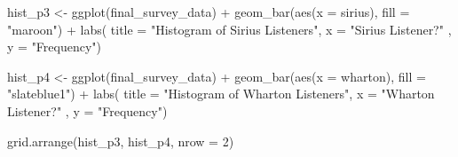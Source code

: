 \documentclass[
]{article}
\newenvironment{Shaded}{\begin{snugshade}}{\end{snugshade}}
\newcommand{\AttributeTok}[1]{\textcolor[rgb]{0.77,0.63,0.00}{#1}}
\newcommand{\DecValTok}[1]{\textcolor[rgb]{0.00,0.00,0.81}{#1}}
\newcommand{\FunctionTok}[1]{\textcolor[rgb]{0.00,0.00,0.00}{#1}}
\newcommand{\NormalTok}[1]{#1}
\newcommand{\OtherTok}[1]{\textcolor[rgb]{0.56,0.35,0.01}{#1}}
\newcommand{\SpecialCharTok}[1]{\textcolor[rgb]{0.00,0.00,0.00}{#1}}
\newcommand{\StringTok}[1]{\textcolor[rgb]{0.31,0.60,0.02}{#1}}
\begin{document}
\begin{Shaded}
\begin{Highlighting}[]
\NormalTok{hist\_p3 }\OtherTok{\textless{}{-}} \FunctionTok{ggplot}\NormalTok{(final\_survey\_data) }\SpecialCharTok{+} 
  \FunctionTok{geom\_bar}\NormalTok{(}\FunctionTok{aes}\NormalTok{(}\AttributeTok{x =}\NormalTok{ sirius), }\AttributeTok{fill =} \StringTok{"maroon"}\NormalTok{) }\SpecialCharTok{+}
  \FunctionTok{labs}\NormalTok{( }\AttributeTok{title =} \StringTok{"Histogram of Sirius Listeners"}\NormalTok{, }\AttributeTok{x =} \StringTok{"Sirius Listener?"}\NormalTok{ , }\AttributeTok{y =} \StringTok{"Frequency"}\NormalTok{)}

\NormalTok{hist\_p4 }\OtherTok{\textless{}{-}} \FunctionTok{ggplot}\NormalTok{(final\_survey\_data) }\SpecialCharTok{+} 
  \FunctionTok{geom\_bar}\NormalTok{(}\FunctionTok{aes}\NormalTok{(}\AttributeTok{x =}\NormalTok{ wharton), }\AttributeTok{fill =} \StringTok{"slateblue1"}\NormalTok{) }\SpecialCharTok{+}
  \FunctionTok{labs}\NormalTok{( }\AttributeTok{title =} \StringTok{"Histogram of Wharton Listeners"}\NormalTok{, }\AttributeTok{x =} \StringTok{"Wharton Listener?"}\NormalTok{ , }\AttributeTok{y =} \StringTok{"Frequency"}\NormalTok{)}

\FunctionTok{grid.arrange}\NormalTok{(hist\_p3, hist\_p4, }\AttributeTok{nrow =} \DecValTok{2}\NormalTok{)}
\end{Highlighting}
\end{Shaded}
\end{document}
